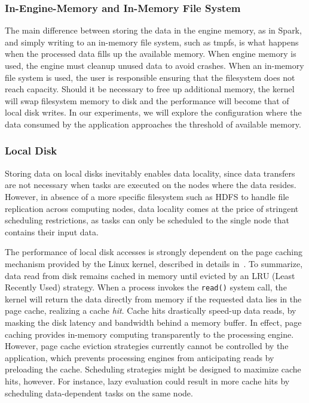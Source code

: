 \documentclass{IEEEtran}
\begin{document}
\subsubsection{In-Engine-Memory and In-Memory File System} 

 The main difference between storing the data in the engine memory, as in Spark, 
 and simply writing to an in-memory file system, such as tmpfs, is 
 what happens when the processed data fills up the available 
 memory. When engine memory is used, the engine must cleanup 
 unused data to avoid crashes. When an in-memory 
 file system is used, the user is responsible ensuring that the filesystem does not
 reach capacity. Should it be necessary to free up additional memory, the kernel will swap filesystem memory to disk
 and the performance will become that of local disk writes. In our experiments, 
 we will explore the configuration where the data consumed by the 
 application approaches the threshold of available memory.

\subsubsection{Local Disk} %


Storing data on local disks inevitably enables data locality, since data transfers are
not necessary when tasks are executed on the nodes where the data resides.
However, in absence of a more specific 
filesystem such as HDFS to handle 
file replication across computing nodes, data locality comes at the price
of stringent scheduling restrictions, as tasks can only be scheduled to the
single node that contains their input data.


The performance of local disk accesses is strongly dependent on the 
page caching mechanism provided by the Linux kernel, described in    
details in~\cite{love2010linux}. To summarize, data read from disk 
remains cached in memory until evicted by an LRU (Least Recently Used) 
strategy. When a process invokes the \texttt{read()} system call, the 
kernel will return the data directly from memory if the requested data 
lies in the page cache, realizing a cache \emph{hit}. Cache hits drastically speed-up data 
reads, by masking the disk latency and bandwidth behind a 
memory buffer. In effect, page caching provides in-memory computing 
transparently to the processing engine. However, page cache eviction 
strategies currently cannot be controlled by the application, which 
prevents processing engines from anticipating reads by preloading the 
cache. Scheduling strategies might be designed 
to maximize cache hits, however. For instance, lazy 
evaluation could result in more cache hits by scheduling data-dependent 
tasks on the same node.
\end{document}
